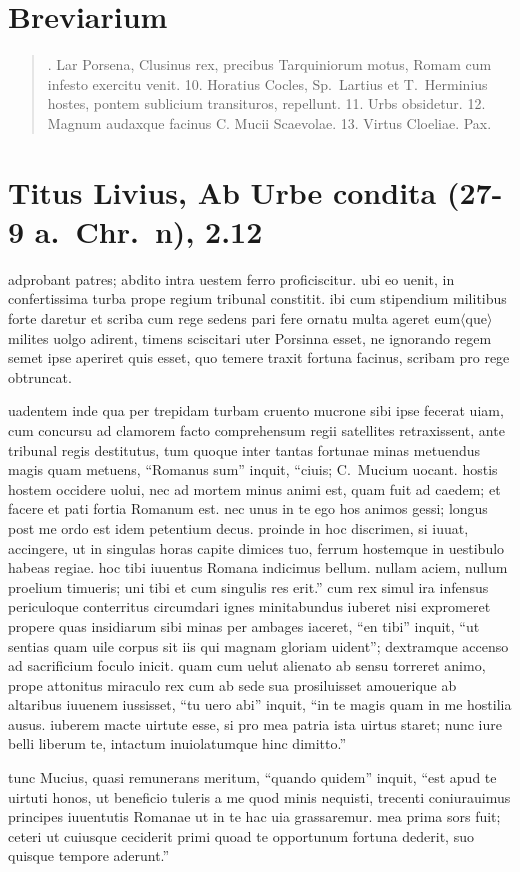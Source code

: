 

\section*{Breviarium}
\begin{quotation}
. Lar Porsena, Clusinus rex, precibus Tarquiniorum motus, Romam cum infesto exercitu venit. 10. Horatius Cocles, Sp.~Lartius et T.~Herminius hostes, pontem sublicium transituros, repellunt. 11. Urbs obsidetur. 12. Magnum audaxque facinus C. Mucii Scaevolae. 13. Virtus Cloeliae. Pax.
\end{quotation}


\section*{Titus Livius, Ab Urbe condita (27-9 a.~Chr.~n), 2.12}

adprobant patres; abdito intra uestem ferro proficiscitur. ubi eo uenit, in confertissima turba prope regium tribunal constitit. ibi cum stipendium militibus forte daretur et scriba cum rege sedens pari fere ornatu multa ageret eum$\langle$que$\rangle$ milites uolgo adirent, timens sciscitari uter Porsinna esset, ne ignorando regem semet ipse aperiret quis esset, quo temere traxit fortuna facinus, scribam pro rege obtruncat. 

uadentem inde qua per trepidam turbam cruento mucrone sibi ipse fecerat uiam, cum concursu ad clamorem facto comprehensum regii satellites retraxissent, ante tribunal regis destitutus, tum quoque inter tantas fortunae minas metuendus magis quam metuens, ``Romanus sum'' inquit, ``ciuis; C.~Mucium uocant. hostis hostem occidere uolui, nec ad mortem minus animi est, quam fuit ad caedem; et facere et pati fortia Romanum est. nec unus in te ego hos animos gessi; longus post me ordo est idem petentium decus. proinde in hoc discrimen, si iuuat, accingere, ut in singulas horas capite dimices tuo, ferrum hostemque in uestibulo habeas regiae. hoc tibi iuuentus Romana indicimus bellum. nullam aciem, nullum proelium timueris; uni tibi et cum singulis res erit.'' cum rex simul ira infensus periculoque conterritus circumdari ignes minitabundus iuberet nisi expromeret propere quas insidiarum sibi minas per ambages iaceret, ``en tibi'' inquit, ``ut sentias quam uile corpus sit iis qui magnam gloriam uident''; dextramque accenso ad sacrificium foculo inicit. quam cum uelut alienato ab sensu torreret animo, prope attonitus miraculo rex cum ab sede sua prosiluisset amouerique ab altaribus iuuenem iussisset, ``tu uero abi'' inquit, ``in te magis quam in me hostilia ausus. iuberem macte uirtute esse, si pro mea patria ista uirtus staret; nunc iure belli liberum te, intactum inuiolatumque hinc dimitto.'' 

tunc Mucius, quasi remunerans meritum, ``quando quidem'' inquit, ``est apud te uirtuti honos, ut beneficio tuleris a me quod minis nequisti, trecenti coniurauimus principes iuuentutis Romanae ut in te hac uia grassaremur. mea prima sors fuit; ceteri ut cuiusque ceciderit primi quoad te opportunum fortuna dederit, suo quisque tempore aderunt.''
